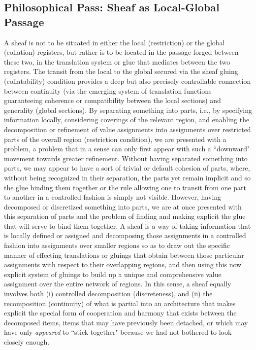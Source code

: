 \documentclass[11pt]{book}
\theoremstyle{definition}
\theoremstyle{definition}
\theoremstyle{definition}
\theoremstyle{theorem}
\theoremstyle{definition}
\begin{document}
\subsection{Philosophical Pass: Sheaf as Local-Global Passage}
A sheaf is not to be situated in either the local (restriction) or the global (collation) registers, but rather is to be located in the passage forged between these two, in the translation system or glue that mediates between the two registers. The transit from the local to the global secured via the sheaf gluing (collatability) condition provides a deep but also precisely controllable connection between continuity (via the emerging system of translation functions guaranteeing coherence or compatibility between the local sections) and generality (global sections). By separating something into parts, i.e., by specifying information locally, considering coverings of the relevant region, and enabling the decomposition or refinement of value assignments into assignments over restricted parts of the overall region (restriction condition), we are presented with a problem, a problem that in a sense can only first appear with such a ``downward" movement towards greater refinement. Without having separated something into parts, we may appear to have a sort of trivial or default cohesion of parts, where, without being recognized in their separation, the parts yet remain implicit and so the glue binding them together or the rule allowing one to transit from one part to another in a controlled fashion is simply not visible. However, having decomposed or discretized something into parts, we are at once presented with this separation of parts and the problem of finding and making explicit the glue that will serve to bind them together. A sheaf is a way of taking information that is locally defined or assigned and decomposing those assignments in a controlled fashion into assignments over smaller regions so as to draw out the specific manner of effecting translations or gluings that obtain between those particular assignments with respect to their overlapping regions, and then using this now explicit system of gluings to build up a unique and comprehensive value assignment over the entire network of regions. In this sense, a sheaf equally involves both (i) controlled decomposition (discreteness), and (ii) the recomposition (continuity) of what is partial into an architecture that makes explicit the special form of cooperation and harmony that exists between the decomposed items, items that may have previously been detached, or which may have only \textit{appeared} to ``stick together" because we had not bothered to look closely enough.\par 
\end{document}

